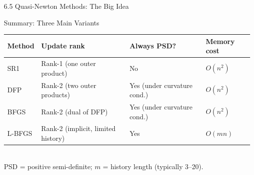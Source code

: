 \documentclass[aspectratio=169,10pt]{beamer}
\begin{document}
\begin{frame}[allowframebreaks]{6.5 Quasi-Newton Methods: The Big Idea}
  \begin{block}{Summary: Three Main Variants}
    \centering
    \begin{tabular}{llll}
      \toprule
      Method & Update rank & Always PSD? & Memory cost \\
      \midrule
      SR1  & Rank-1 (one outer product) & No  & $O(n^2)$ \\
      DFP  & Rank-2 (two outer products) & Yes (under curvature cond.) & $O(n^2)$ \\
      BFGS & Rank-2 (dual of DFP) & Yes (under curvature cond.) & $O(n^2)$ \\
      L-BFGS & Rank-2 (implicit, limited history) & Yes & $O(mn)$ \\
      \bottomrule
    \end{tabular}
    \\[4pt]
    {\scriptsize PSD = positive semi-definite; $m$ = history length (typically 3--20).}
  \end{block}

\end{frame}

\end{document}
